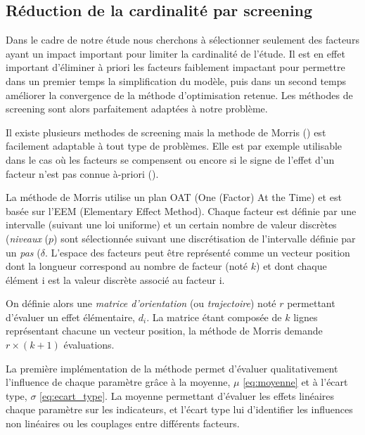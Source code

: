 \subsection{Réduction de la cardinalité par screening} %
\label{sub:reduction_de_la_cardinalite_par_screening}

Dans le cadre de notre étude nous cherchons à sélectionner seulement des facteurs
ayant un impact important pour limiter la cardinalité de l’étude. Il est en effet important
d’éliminer à priori les facteurs faiblement impactant pour permettre dans un premier temps
la simplification du modèle, puis dans un second temps améliorer la convergence
de la méthode d’optimisation retenue.
Les méthodes de screening sont alors parfaitement adaptées à notre problème.

Il existe plusieurs methodes de screening mais la methode de Morris  (\cite{Morris1991161})
est facilement adaptable à tout type de problèmes. Elle est par exemple utilisable dans le cas où
les facteurs se compensent ou encore si le signe de l’effet d’un facteur n’est pas
connue à-priori (\cite{Saltelli2004}).


La méthode de Morris utilise un plan OAT (One (Factor) At the Time) et est basée sur
l’EEM (Elementary Effect Method).
Chaque facteur est définie par une intervalle (suivant une loi uniforme) et un certain
nombre de valeur discrètes (\emph{niveaux} ($p$) sont sélectionnée suivant une discrétisation
de l’intervalle définie par un \emph{pas} ($\delta$. L’espace des facteurs peut être représenté
comme un vecteur position dont la longueur correspond au nombre de facteur (noté $k$) et dont chaque élément i
est la valeur discrète associé au facteur i.

On définie alors une \emph{matrice d’orientation} (ou \emph{trajectoire}) noté $r$
permettant d’évaluer un effet élémentaire, $d_{i}$. La matrice étant composée de $k$ lignes représentant
chacune un vecteur position, la méthode de Morris demande $r \times (k + 1)$ évaluations.


La première implémentation de la méthode permet d’évaluer qualitativement l’influence de chaque
paramètre grâce à la moyenne, $\mu$ \eqref{eq:moyenne} et à l’écart type, $\sigma$ \eqref{eq:ecart_type}.
La moyenne permettant d’évaluer les effets linéaires chaque paramètre sur les indicateurs,
et l’écart type lui d’identifier les influences non linéaires ou les couplages entre différents facteurs.

